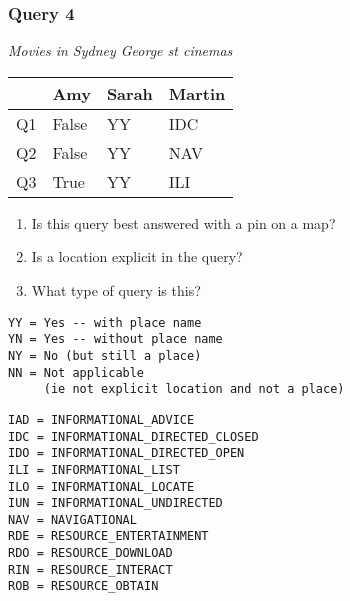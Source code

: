 \begin{frame}[fragile]
\frametitle{Query 4}
\vspace{1em}

\emph{Movies in Sydney George st cinemas}

\vfill

\begin{table}
  \centering
  \begin{tabular}{ l l l l }
    & \textbf{Amy} & \textbf{Sarah} & \textbf{Martin}\\
    \toprule
    Q1 & False & YY & IDC\\
Q2 & False & YY & NAV\\
Q3 & True & YY & ILI\\
    \bottomrule
  \end{tabular}
\end{table}

\vfill

\tiny{

\begin{enumerate}
\item Is this query best answered with a pin on a map?
\item Is a location explicit in the query?
\item What type of query is this?
\end{enumerate}

\vfill

\begin{multicols}{2}
\begin{verbatim}
YY = Yes -- with place name
YN = Yes -- without place name
NY = No (but still a place)
NN = Not applicable 
     (ie not explicit location and not a place)
\end{verbatim}

\columnbreak
\begin{verbatim}
IAD = INFORMATIONAL_ADVICE
IDC = INFORMATIONAL_DIRECTED_CLOSED
IDO = INFORMATIONAL_DIRECTED_OPEN
ILI = INFORMATIONAL_LIST
ILO = INFORMATIONAL_LOCATE
IUN = INFORMATIONAL_UNDIRECTED
NAV = NAVIGATIONAL
RDE = RESOURCE_ENTERTAINMENT
RDO = RESOURCE_DOWNLOAD
RIN = RESOURCE_INTERACT
ROB = RESOURCE_OBTAIN
\end{verbatim}
\end{multicols}
}

\end{frame}



